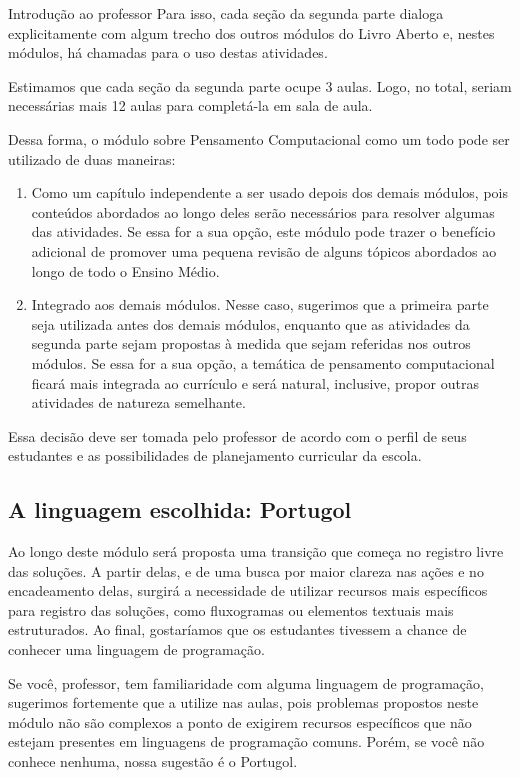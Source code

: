 \begin{apresentacao}{Introdução ao professor}
Para isso, cada seção da segunda parte dialoga explicitamente com algum trecho dos outros módulos do Livro Aberto e, nestes módulos, há chamadas para o uso destas atividades.

Estimamos que cada seção da segunda parte ocupe 3 aulas. Logo, no total, seriam necessárias mais 12 aulas para completá-la em sala de aula.

Dessa forma, o módulo sobre Pensamento Computacional como um todo pode ser utilizado de duas maneiras:

\begin{enumerate}
\item Como um capítulo independente a ser usado depois dos demais módulos, pois conteúdos abordados ao longo deles serão necessários para resolver algumas das atividades. Se essa for a sua opção, este módulo pode trazer o benefício adicional de promover uma pequena revisão de alguns tópicos abordados ao longo de todo o Ensino Médio.
\item Integrado aos demais módulos. Nesse caso, sugerimos que a primeira parte seja utilizada antes dos demais módulos, enquanto que as atividades da segunda parte sejam propostas à medida que sejam referidas nos outros módulos. Se essa for a sua opção, a temática de pensamento computacional ficará mais integrada ao currículo e será natural, inclusive, propor outras atividades de natureza semelhante.
\end{enumerate}

Essa decisão deve ser tomada pelo professor de acordo com o perfil de seus estudantes e as possibilidades de planejamento curricular da escola.

\subsection{A linguagem escolhida: Portugol}

Ao longo deste módulo será proposta uma transição que começa no registro livre das soluções. A partir delas, e de uma busca por maior clareza nas ações e no encadeamento delas, surgirá a necessidade de utilizar recursos mais específicos para registro das soluções, como fluxogramas ou elementos textuais mais estruturados. Ao final, gostaríamos que os estudantes tivessem a chance de conhecer uma linguagem de programação.

Se você, professor, tem familiaridade com alguma linguagem de programação, sugerimos fortemente que a utilize nas aulas, pois problemas propostos neste módulo não são complexos a ponto de exigirem recursos específicos que não estejam presentes em linguagens de programação comuns. Porém, se você não conhece nenhuma, nossa sugestão é o Portugol.


\end{apresentacao}
